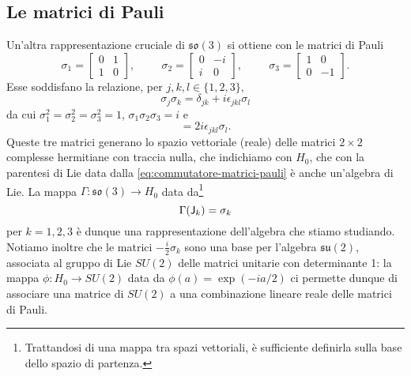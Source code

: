 \subsection{Le matrici di Pauli}
Un'altra rappresentazione cruciale di $\mathfrak{so}(3)$ si ottiene con le matrici di Pauli
\begin{equation}
	\sigma_1=
	\begin{bmatrix}
		0&1\\1&0
	\end{bmatrix},
	\hspace{1cm}
	\sigma_2=
	\begin{bmatrix}
		0&-i\\i&0
	\end{bmatrix},
	\hspace{1cm}
	\sigma_3=
	\begin{bmatrix}
		1&0\\0&-1
	\end{bmatrix}.
	\label{eq:matrici-pauli}
\end{equation}
Esse soddisfano la relazione, per $j,k,l\in\{1,2,3\}$,
\begin{equation}
	\sigma_j\sigma_k=\delta_{jk}+i\epsilon_{jkl}\sigma_l
	\label{eq:prodotto-matrici-pauli}
\end{equation}
da cui $\sigma_1^2=\sigma_2^2=\sigma_3^2=1$, $\sigma_1\sigma_2\sigma_3=i$ e
\begin{equation}
	[\sigma_j,\sigma_k]=2i\epsilon_{jkl}\sigma_l.
	\label{eq:commutatore-matrici-pauli}
\end{equation}
Queste tre matrici generano lo spazio vettoriale (reale) delle matrici $2\times 2$ complesse hermitiane con traccia nulla, che indichiamo con $H_0$, che con la parentesi di Lie data dalla \eqref{eq:commutatore-matrici-pauli} è anche un'algebra di Lie.
La mappa $\Gamma\colon\mathfrak{so}(3)\to H_0$ data da\footnote{
	Trattandosi di una mappa tra spazi vettoriali, è sufficiente definirla sulla base dello spazio di partenza.
}
\begin{equation}
	\Gamma(\mathsf{J}_k)=\sigma_k
	\label{eq:rappresentazione-so3-matrici-pauli}
\end{equation}
per $k=1,2,3$ è dunque una rappresentazione dell'algebra che stiamo studiando.
Notiamo inoltre che le matrici $-\frac{i}2\sigma_k$ sono una base per l'algebra $\mathfrak{su}(2)$, associata al gruppo di Lie $SU(2)$ delle matrici unitarie con determinante 1: la mappa $\phi\colon H_0\to SU(2)$ data da $\phi(a)=\exp(-ia/2)$ ci permette dunque di associare una matrice di $SU(2)$ a una combinazione lineare reale delle matrici di Pauli.

